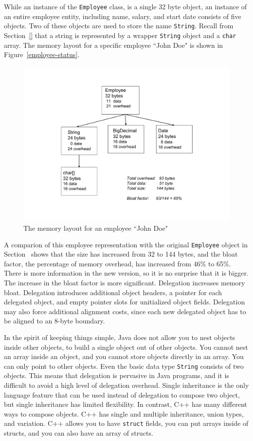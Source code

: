 While an instance of the \texttt{Employee} class, is a single 32 byte object, an instance of an entire employee entity, including name, salary, and start date consists of five objects. Two of these objects are used to store the name \texttt{String}. Recall from Section~\ref{} that a string is represented by a wrapper \texttt{String} object and a \texttt{char} array. The memory layout for a specific employee ``John Doe" is shown in Figure~\ref{employee-status}. 
 \begin{figure}
  \centering
 \includegraphics[width=.60\textwidth]{Figures/chapter4/employee-status.pdf}
  \caption{The memory layout for an employee ``John Doe"}
  \label{fig:employee-status}
\end{figure}

A comparion of this employee representation with the original \texttt{Employee} object in Section~\cite{CostOfObects} shows that the size has increased from 32 to 144 bytes, and the bloat factor, the percentage of memory overhead, has increased from 46\% to 65\%. There is more information in the new version, so it is no surprise that it is bigger. The increase in the bloat factor is more significant. Delegation increases memory bloat. Delegation introduces additional object headers, a pointer for each delegated object, and empty pointer slots for unitialized object fields. Delegation may also force additional alignment costs, since each new delegated object has to be aligned to an 8-byte boundary. 

In the spirit of keeping things simple, Java does not allow you to nest objects inside other objects, to build a single object out of other objects. You cannot nest an array inside an object, and you cannot store objects directly in an array.  You can only point to other objects. Even the basic data type \texttt{String} consists of two objects. This means that delegation is pervasive in Java programs, and it is difficult to avoid a high level of delegation overhead. Single inheritance is the only language feature that can be used instead of delegation to compose two object, but single inheritance has limited flexibility.  In contrast, C++ has many different ways to compose objects. C++ has single and multiple inheritance, union types, and variation. C++ allows you to have \texttt{struct} fields, you can put arrays inside of structs, and you can also have an array of structs.  


